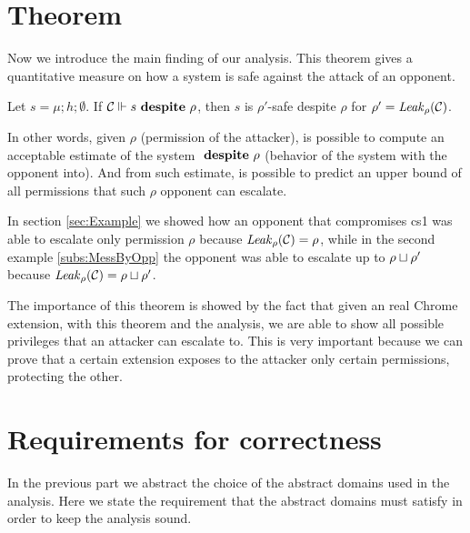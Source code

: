 
\section{Theorem}
\label{sec:Theorem}
Now we introduce the main finding of our analysis. This theorem gives a quantitative measure on how a system is safe against the attack of an opponent. 
\begin{theorem}
\label{thm:safety-compromise}
Let $s = \mu;h;\emptyset$. If ${\cal C} \Vdash s \ \mathbf{despite}\ \rho$, then $s$ is $\rho'$-safe despite $\rho$ for $\rho' = \mathit{Leak}_{\rho}({\cal C})$. 
\end{theorem}
In other words, given $\rho$ (permission of the attacker), is possible to compute an acceptable estimate of the system $\ \mathbf{despite}\ \rho$ (behavior of the system with the opponent into). And from such estimate, is possible to predict an upper bound of all permissions that such $\rho$ opponent can escalate.

In section \ref{sec:Example} we showed how an opponent that compromises cs1 was able to escalate only permission $\rho$ because $\mathit{Leak}_{\rho}({\cal C}) = \rho$, while in the second example \ref{subs:MessByOpp} the opponent was able to escalate up to $\rho \sqcup \rho'$ because $\mathit{Leak}_{\rho}({\cal C}) = \rho \sqcup \rho'$.

The importance of this theorem is showed by the fact that given an real Chrome extension, with this theorem and the analysis, we are able to show all possible privileges that an attacker can escalate to. This is very important because we can prove that a certain extension exposes to the attacker only certain permissions, protecting the other.

\section{Requirements for correctness}
\label{sec:CorrectnesReqs}
In the previous part we abstract the choice of the abstract domains used in the analysis. Here we state the requirement that the abstract domains must satisfy in order to keep the analysis sound.


